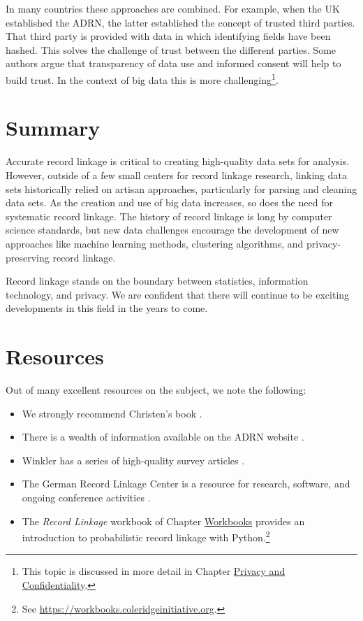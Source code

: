 \documentclass[]{krantz}
\begin{document}
In many countries these approaches are combined. For example, when the
UK established the ADRN, the latter established the concept of trusted
third parties. That third party is provided with data in which
identifying fields have been hashed. This solves the challenge of trust
between the different parties. Some authors argue that transparency of
data use and informed consent will help to build trust. In the context
of big data this is more challenging\footnote{This topic is discussed in
  more detail in Chapter \protect\hyperlink{chap:privacy}{Privacy and
  Confidentiality}.}.

\section{Summary}\label{summary-1}

Accurate record linkage is critical to creating high-quality data sets
for analysis. However, outside of a few small centers for record linkage
research, linking data sets historically relied on artisan approaches,
particularly for parsing and cleaning data sets. As the creation and use
of big data increases, so does the need for systematic record linkage.
The history of record linkage is long by computer science standards, but
new data challenges encourage the development of new approaches like
machine learning methods, clustering algorithms, and privacy-preserving
record linkage.

Record linkage stands on the boundary between statistics, information
technology, and privacy. We are confident that there will continue to be
exciting developments in this field in the years to come.

\section{Resources}\label{resources}

Out of many excellent resources on the subject, we note the following:

\begin{itemize}
\item
  We strongly recommend Christen's book \citep{christen2012data}.
\item
  There is a wealth of information available on the ADRN website
  \citep{EconomicandSocialResearchCouncil2016}.
\item
  Winkler has a series of high-quality survey articles
  \citep{WICS:WICS1317}.
\item
  The German Record Linkage Center is a resource for research, software,
  and ongoing conference activities \citep{Schnell2016}.
\item
  The \emph{Record Linkage} workbook of Chapter
  \protect\hyperlink{chap:workbooks}{Workbooks} provides an introduction
  to probabilistic record linkage with Python.\footnote{See
    \url{https://workbooks.coleridgeinitiative.org}.}
\end{itemize}
\end{document}

